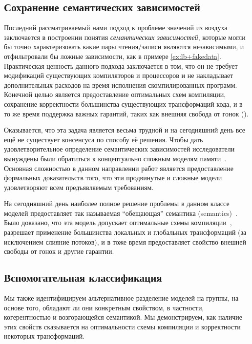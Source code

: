 \subsection{Сохранение семантических зависимостей}
\label{sec:analysis:sdeprf}

Последний рассматриваемый нами подход к проблеме значений из воздуха 
заключается в построении понятия \emph{семантических зависимостей}, 
которые могли бы точно характеризовать какие пары чтения/записи
являются независимыми, и отфильтровали бы ложные зависимости, 
как в примере \ref{ex:lb+fakedata}.
Практическая ценность данного подхода заключается в том, что 
он не требует модификаций существующих компиляторов 
и процессоров и не накладывает дополнительных 
расходов на время исполнения скомпилированных программ. 
Конечной целью является предоставление оптимальных схем компиляции, 
сохранение корректности большинства существующих трансформаций кода, 
и в то же время поддержка важных гарантий, 
таких как внешняя свобода от гонок (\eDRF).

Оказывается, что эта задача является весьма трудной 
и на сегодняшний день все ещё не существует консенсуса 
по способу её решения. 
Чтобы дать удовлетворительное определение семантических зависимостей 
исследователи вынуждены были обратиться к концептуально 
сложным моделям памяти~\cite{Jagadeesan-al:ESOP10, Kang-al:POPL17, 
Jeffrey-Riely:LICS16, PichonPharabod-Sewell:POPL16, 
Chakraborty-Vafeiadis:POPL19, Paviotti-al:ESOP20}.
Основная сложностью в данном направлении работ 
является предоставление формальных доказательств того, 
что эти продвинутые и сложные модели удовлетворяют 
всем предъявляемым требованиям. 

На сегодняшний день наиболее полное решение 
проблемы в данном классе моделей предоставляет 
так называемая ``обещающая'' семантика 
(\Promising semantics)~\cite{Kang-al:POPL17, Lee-al:PLDI20}. 
Было доказано, что эта модель допускает 
оптимальные схемы компиляции~\cite{Podkopaev-al:POPL19}, 
разрешает применение большинства локальных и глобальных 
трансформаций (за исключением слияние потоков), 
и в тоже время предоставляет 
свойство внешней свободы от гонок и другие гарантии. 

\subsection{Вспомогательная классификация}
\label{sec:analysis:other}

Мы также идентифицируем альтернативное разделение моделей на группы, 
на основе того, обладают ли они конкретным свойством, 
в частности, когерентностью и возгорающейся семантикой. 
Мы демонстрируем, как наличие этих свойств сказывается 
на оптимальности схемы компиляции и корректности некоторых трансформаций. 

